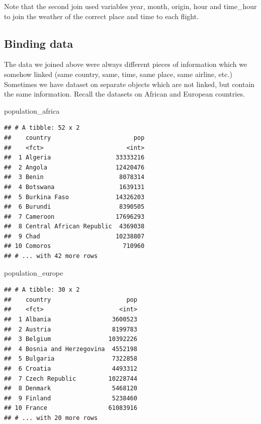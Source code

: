 \documentclass[]{tufte-book}
\newenvironment{Shaded}{}{}
\newcommand{\NormalTok}[1]{#1}
\begin{document}
Note that the second join used variables year, month, origin, hour and time\_hour to join the weather of the correct place and time to each flight.

\hypertarget{binding-data}{%
\subsection{Binding data}\label{binding-data}}

The data we joined above were always different pieces of information which we somehow linked (same country, same, time, same place, same airline, etc.) Sometimes we have dataset on separate objects which are not linked, but contain the same information. Recall the datasets on African and European countries.

\begin{Shaded}
\begin{Highlighting}[]
\NormalTok{population_africa}
\end{Highlighting}
\end{Shaded}

\begin{verbatim}
## # A tibble: 52 x 2
##    country                       pop
##    <fct>                       <int>
##  1 Algeria                  33333216
##  2 Angola                   12420476
##  3 Benin                     8078314
##  4 Botswana                  1639131
##  5 Burkina Faso             14326203
##  6 Burundi                   8390505
##  7 Cameroon                 17696293
##  8 Central African Republic  4369038
##  9 Chad                     10238807
## 10 Comoros                    710960
## # ... with 42 more rows
\end{verbatim}

\begin{Shaded}
\begin{Highlighting}[]
\NormalTok{population_europe}
\end{Highlighting}
\end{Shaded}

\begin{verbatim}
## # A tibble: 30 x 2
##    country                     pop
##    <fct>                     <int>
##  1 Albania                 3600523
##  2 Austria                 8199783
##  3 Belgium                10392226
##  4 Bosnia and Herzegovina  4552198
##  5 Bulgaria                7322858
##  6 Croatia                 4493312
##  7 Czech Republic         10228744
##  8 Denmark                 5468120
##  9 Finland                 5238460
## 10 France                 61083916
## # ... with 20 more rows
\end{verbatim}
\end{document}
